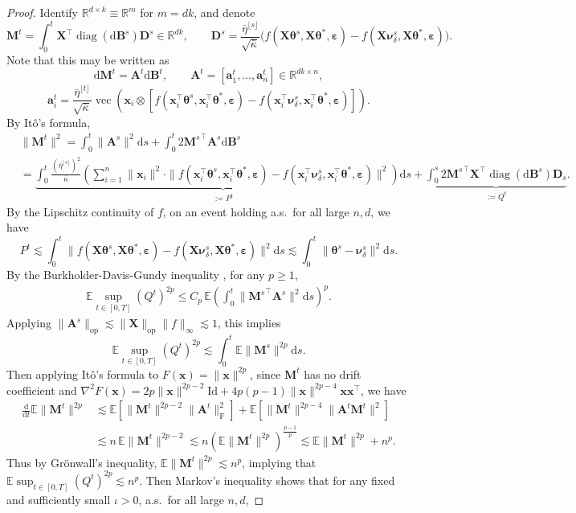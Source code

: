 \documentclass[11pt,letterpaper,reqno]{amsart}
\theoremstyle{definition}
\def\d{\mathrm{d}}
\def\E{\mathbb{E}}
\def\R{\mathbb{R}}
\def\Id{\mathrm{Id}}
\def\op{\mathrm{op}}
\def\vec{\operatorname{vec}}
\def\diag{\operatorname{diag}}
\def\sF{\mathrm{F}}
\def\a{\mathbf{a}}
\def\x{\mathbf{x}}
\def\A{\mathbf{A}}
\def\B{\mathbf{B}}
\def\bD{\mathbf{D}}
\def\M{\mathbf{M}}
\def\X{\mathbf{X}}
\def\beps{\boldsymbol{\varepsilon}}
\def\btheta{\boldsymbol{\theta}}
\def\bnu{\boldsymbol{\nu}}
\newcommand{\flr}[1]{{\lfloor {#1} \rfloor}}
\newcommand{\norm}[1]{\|#1\|}
\newcommand{\brk}[1]{\left[{#1}\right]} %
\begin{document}
\begin{proof}
Identify $\R^{d \times k} \equiv \R^m$ for $m=dk$, and denote
\[\M^t=\int_0^t \X^\top \diag(\d\B^s)\bD^s \in \R^{dk},
\qquad \bD^s=\frac{\bar\eta^{\flr{s}}}{\sqrt{\bar\kappa}}
\big(f(\X\btheta^s,\X\btheta^*,\beps)
-f(\X\bnu_\delta^s,\X\btheta^*,\beps)\big).\]
Note that this may be written as
\[\d\M^t=\A^t \d\B^t,\qquad
\A^t=[\a_1^t,\ldots,\a_n^t] \in \R^{dk \times n},\]
\[\a_i^t=\frac{\bar\eta^{\flr{t}}}{\sqrt{\bar\kappa}}
\vec(\x_i \otimes [f(\x_i^\top \btheta^s,\x_i^\top \btheta^*,\beps)
-f(\x_i^\top \bnu_\delta^s,\x_i^\top \btheta^*,\beps)]).\]
By It\^o's formula,
\begin{align*}
&\norm{\M^t}^2=\int_0^t \|\A^s\|^2 \d s
+\int_0^t 2{\M^s}^\top \A^s \d\B^s\\
&=\underbrace{\int_0^t \frac{(\bar\eta^{\flr{s}})^2}{\bar\kappa}
\left(\sum_{i=1}^n  \|\x_i\|^2 \cdot \|f(\x_i^\top \btheta^s,\x_i^\top
\btheta^*,\beps)-f(\x_i^\top \bnu_\delta^s,\x_i^\top
\btheta^*,\beps)\|^2\right)\d s}_{:=P^t}
+\underbrace{\int_0^s 2{\M^s}^\top \X^\top \diag(\d\B^s)\bD_s}_{:=Q^t}.
\end{align*}
By the Lipschitz continuity of $f$, on an event holding a.s.\ for all large
$n,d$, we have
\[P^t \lesssim \int_0^t \|f(\X \btheta^s,\X \btheta^*,\beps)-f(\X
\bnu_\delta^s,\X \btheta^*,\beps)\|^2 \d s
\lesssim \int_0^t \|\btheta^s-\bnu_\delta^s\|^2 \d s.\]
By the Burkholder-Davis-Gundy inequality
\cite[Theorem 2.11]{kunita2004stochastic}, for any $p \geq 1$,
\begin{align}
    \E \sup_{t\in[0,T]} (Q^t)^{2p} \leq C_p\,
\E\left(\int_0^t \|{\M^s}^\top \A^s\|^2 \d s\right)^p.
\end{align}
Applying $\|\A^s\|_\op \lesssim \|\X\|_\op\|f\|_\infty \lesssim 1$, this implies
\[\E\sup_{t\in[0,T]} (Q^t)^{2p} \lesssim
\int_0^t \E \norm{\M^s}^{2p} \d s.\]
Then applying It\^o's formula to $F(\x)=\norm{\x}^{2p}$, since $\M^t$ has no drift
coefficient and
$\nabla^2 F(\x)=2p\norm{\x}^{2p-2}\Id+4p(p-1)\norm{\x}^{2p-4}\x\x^\top$,
we have
\begin{align}
\frac{\d}{\d t} \E\norm{\M^t}^{2p} &\lesssim
\E\brk{\norm{\M^t}^{2p-2}\|\A^t\|_\sF^2} +
\E\brk{\norm{\M^t}^{2p-4}\norm{{\A^t}\M^t}^2}\nonumber\\
    &\lesssim n\,\E\norm{\M^t}^{2p-2} \lesssim
n(\E\norm{\M^t}^{2p})^{\frac{p-1}{p}}
\lesssim \E\norm{\M^t}^{2p}+n^p.
\end{align}
Thus by Gr\"onwall's inequality,
$\E\norm{\M^t}^{2p} \lesssim n^p$, implying that
$\E \sup_{t\in[0,T]} (Q^t)^{2p} \lesssim n^p$.
Then Markov's inequality shows that
for any fixed and sufficiently small $\iota>0$, a.s.\ for all large $n,d$,

\end{proof}
\end{document}
